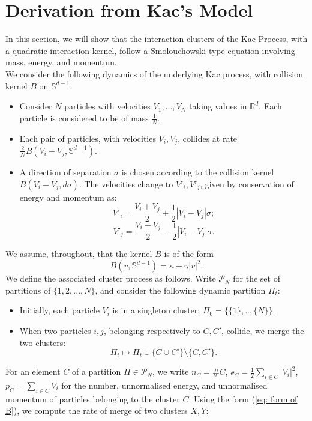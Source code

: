 \section{Derivation from Kac's Model}
In this section, we will show that the interaction clusters of the Kac Process, with a quadratic interaction kernel, follow a Smolouchowski-type equation involving mass, energy, and momentum. \medskip \\ We consider the following dynamics of the underlying Kac process, with collision kernel $B$ on $\mathbb{S}^{d-1}:$
\begin{itemize}
    \item Consider $N$ particles with velocities $V_1, ..., V_N$ taking values in $\mathbb{R}^d.$ Each particle is considered to be of mass $\frac{1}{N}.$
    \item Each pair of particles, with velocities $V_i, V_j$, collides at rate $\frac{2}{N}B(V_i-V_j, \mathbb{S}^{d-1})$. \item A direction of separation $\sigma$ is chosen according to the collision kernel $B(V_i-V_j,d\sigma)$. The velocities change to $V'_i, V'_j$, given by conservation of energy and momentum as: \begin{equation*} V'_i=\frac{V_i+V_j}{2}+\frac{1}{2}|V_i-V_j|\sigma;\end{equation*}  \begin{equation*} V'_j=\frac{V_i+V_j}{2}-\frac{1}{2}|V_i-V_j|\sigma.\end{equation*}
\end{itemize} We assume, throughout, that the kernel $B$ is of the form\begin{equation}
    \label{eq: form of B} B(v, \mathbb{S}^{d-1})=\kappa+\gamma|v|^2.
\end{equation}We define the associated cluster process as follows. Write $\mathcal{P}_N$ for the set of partitions of $\{1, 2,...,N\}$, and consider the following dynamic partition $\Pi_t:$ \begin{itemize}
    \item Initially, each particle $V_i$ is in a singleton cluster: $\Pi_0=\{\{1\},..,\{N\}\}$.
    \item When two particles $i,j$, belonging respectively to $C, C'$, collide, we merge the two clusters: \begin{equation*}
        \Pi_t \mapsto \Pi_t \cup \{C\cup C'\}\setminus \{C,C'\}.
    \end{equation*}
\end{itemize} For an element $C$ of a partition $\Pi\in\mathcal{P}_N$, we write $n_C=\#C$, $\mathcal{e}_C=\frac{1}{2}\sum_{i\in C} |V_i|^2$, $p_C=\sum_{i\in C}V_i$ for the number, unnormalised energy, and unnormalised momentum of particles belonging to the cluster $C$. Using the form (\ref{eq: form of B}), we compute the rate of merge of two clusters $X, Y$: \begin{multline*}

\end{multline*}
